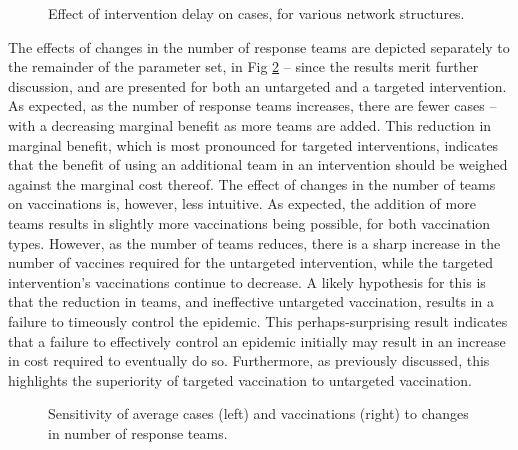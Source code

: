 \documentclass[10pt,letterpaper]{article}
\begin{document}
\begin{figure}[ht!]
\begin{center}
    \caption{Effect of intervention delay on cases, for various network structures.}
    \label{fig:sens_int_delay}
\end{center}
\end{figure}

The effects of changes in the number of response teams are depicted separately to the remainder of the parameter set, in Fig \ref{fig:sens_team} -- since the results merit further discussion, and are presented for both an untargeted and a targeted intervention. As expected, as the number of response teams increases, there are fewer cases -- with a decreasing marginal benefit as more teams are added. This reduction in marginal benefit, which is most pronounced for targeted interventions, indicates that the benefit of using an additional team in an intervention should be weighed against the marginal cost thereof.
The effect of changes in the number of teams on vaccinations is, however, less intuitive. As expected, the addition of more teams results in slightly more vaccinations being possible, for both vaccination types. However, as the number of teams reduces, there is a sharp increase in the number of vaccines required for the untargeted intervention, while the targeted intervention's vaccinations continue to decrease. A likely hypothesis for this is that the reduction in teams, and ineffective untargeted vaccination, results in a failure to timeously control the epidemic. This perhaps-surprising result indicates that a failure to effectively control an epidemic initially may result in an increase in cost required to eventually do so. Furthermore, as previously discussed, this highlights the superiority of targeted vaccination to untargeted vaccination.

\begin{figure}[ht!]
  \caption{Sensitivity of average cases (left) and vaccinations (right) to changes in number of response teams.}
  \label{fig:sens_team}
\end{figure}
\end{document}
